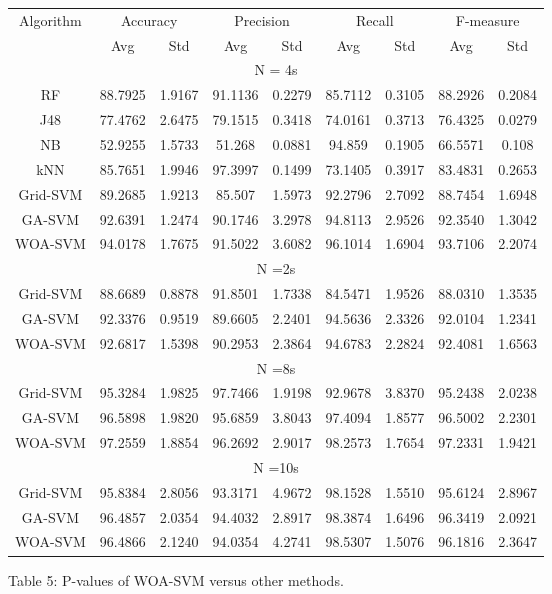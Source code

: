 \documentclass{article}
\begin{document}
\begin{tabular}{|c|c|c|c|c|c|c|c|c|}\hline
\multirow{2}{*}{Algorithm} & \multicolumn{2}{|c|}{Accuracy} & \multicolumn{2}{|c|}{Precision} & \multicolumn{2}{|c|}{Recall} & \multicolumn{2}{|c|}{F-measure} \\ \cline{2-9}
  & Avg & Std & Avg & Std & Avg & Std & Avg & Std \\ \hline
\multicolumn{9}{|c|}{N = 4s} \\ \hline
RF & 88.7925 & 1.9167 & 91.1136 & 0.2279 & 85.7112 & 0.3105 & 88.2926 & 0.2084 \\ \hline
J48 & 77.4762 & 2.6475 & 79.1515 & 0.3418 & 74.0161 & 0.3713 & 76.4325 & 0.0279 \\ \hline
NB & 52.9255 & 1.5733 & 51.268 & 0.0881 & 94.859 & 0.1905 & 66.5571 & 0.108 \\ \hline
kNN & 85.7651 & 1.9946 & 97.3997 & 0.1499 & 73.1405 & 0.3917 & 83.4831 & 0.2653 \\ \hline
Grid-SVM & 89.2685 & 1.9213 & 85.507 & 1.5973 & 92.2796 & 2.7092 & 88.7454 & 1.6948 \\ \hline
GA-SVM & 92.6391 & 1.2474 & 90.1746 & 3.2978 & 94.8113 & 2.9526 & 92.3540 & 1.3042 \\ \hline
WOA-SVM & 94.0178 & 1.7675 & 91.5022 & 3.6082 & 96.1014 & 1.6904 & 93.7106 & 2.2074 \\ \hline
\multicolumn{9}{|c|}{N =2s} \\ \hline
Grid-SVM & 88.6689 & 0.8878 & 91.8501 & 1.7338 & 84.5471 & 1.9526 & 88.0310 & 1.3535 \\ \hline
GA-SVM & 92.3376 & 0.9519 & 89.6605 & 2.2401 & 94.5636 & 2.3326 & 92.0104 & 1.2341 \\ \hline
WOA-SVM & 92.6817 & 1.5398 & 90.2953 & 2.3864 & 94.6783 & 2.2824 & 92.4081 & 1.6563 \\ \hline
\multicolumn{9}{|c|}{N =8s} \\ \hline
Grid-SVM & 95.3284 & 1.9825 & 97.7466 & 1.9198 & 92.9678 & 3.8370 & 95.2438 & 2.0238 \\ \hline
GA-SVM & 96.5898 & 1.9820 & 95.6859 & 3.8043 & 97.4094 & 1.8577 & 96.5002 & 2.2301 \\ \hline
WOA-SVM & 97.2559 & 1.8854 & 96.2692 & 2.9017 & 98.2573 & 1.7654 & 97.2331 & 1.9421 \\ \hline
\multicolumn{9}{|c|}{N =10s} \\ \hline
Grid-SVM & 95.8384 & 2.8056 & 93.3171 & 4.9672 & 98.1528 & 1.5510 & 95.6124 & 2.8967 \\ \hline
GA-SVM & 96.4857 & 2.0354 & 94.4032 & 2.8917 & 98.3874 & 1.6496 & 96.3419 & 2.0921 \\ \hline
WOA-SVM & 96.4866 & 2.1240 & 94.0354 & 4.2741 & 98.5307 & 1.5076 & 96.1816 & 2.3647 \\ \hline
\end{tabular}
Table 5: P-values of WOA-SVM versus other methods.
\end{document}

